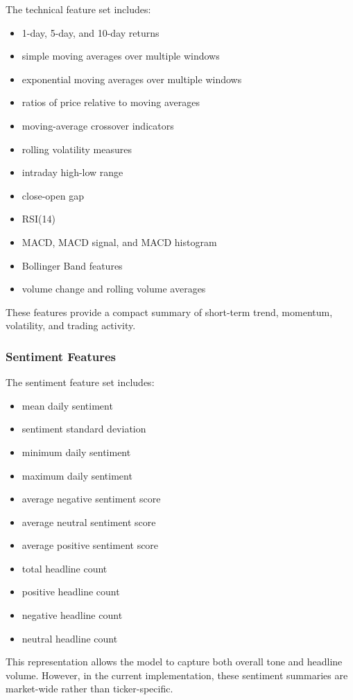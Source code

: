 \documentclass[11pt]{article}
\begin{document}
The technical feature set includes:
\begin{itemize}
    \item 1-day, 5-day, and 10-day returns
    \item simple moving averages over multiple windows
    \item exponential moving averages over multiple windows
    \item ratios of price relative to moving averages
    \item moving-average crossover indicators
    \item rolling volatility measures
    \item intraday high-low range
    \item close-open gap
    \item RSI(14)
    \item MACD, MACD signal, and MACD histogram
    \item Bollinger Band features
    \item volume change and rolling volume averages
\end{itemize}

These features provide a compact summary of short-term trend, momentum, volatility, and trading activity.

\subsubsection{Sentiment Features}

The sentiment feature set includes:
\begin{itemize}
    \item mean daily sentiment
    \item sentiment standard deviation
    \item minimum daily sentiment
    \item maximum daily sentiment
    \item average negative sentiment score
    \item average neutral sentiment score
    \item average positive sentiment score
    \item total headline count
    \item positive headline count
    \item negative headline count
    \item neutral headline count
\end{itemize}

This representation allows the model to capture both overall tone and headline volume. However, in the current implementation, these sentiment summaries are market-wide rather than ticker-specific.
\end{document}
